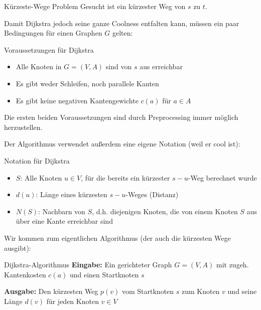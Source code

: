 \documentclass{panikzettel}
\newcommand{\boxspace}{	\vspace{-\baselineskip}	}
\begin{document}
{\begin{defi}{Kürzeste-Wege Problem}
	Gesucht ist ein kürzester Weg von $s$ zu $t$.
\end{defi}

\begin{halfboxl}
	\boxspace
Damit Dijkstra jedoch seine ganze Coolness entfalten kann, müssen ein paar Bedingungen für einen Graphen $G$ gelten:

\begin{theo}{Voraussetzungen für Dijkstra}
\begin{itemize}
	\item Alle Knoten in $G = (V,A)$ sind von $s$ aus erreichbar
	\item Es gibt weder Schleifen, noch parallele Kanten
	\item Es gibt keine negativen Kantengewichte $c(a)$ für $a \in A$
\end{itemize}

Die ersten beiden Voraussetzungen sind durch Preprocessing immer möglich herzustellen.

\end{theo}

\end{halfboxl}%
\begin{halfboxr}
	\boxspace
Der Algorithmus verwendet außerdem eine eigene Notation (weil er cool ist):

	\vspace{\baselineskip}
\begin{defi}{Notation für Dijkstra}
	\begin{itemize}
		\item $S$: Alle Knoten $u \in V$, für die bereits ein kürzester $s-u$-Weg berechnet wurde
		\item $d(u)$: Länge eines kürzesten $s-u$-Weges (Distanz)
		\item $N(S)$: Nachbarn von $S$, d.h. diejenigen Knoten, die von einem Knoten $S$ aus über eine Kante erreichbar sind
	\end{itemize}
\end{defi}
\end{halfboxr}

Wir kommen zum eigentlichen Algorithmus (der auch die kürzesten Wege ausgibt):

\begin{algo}{Dijkstra-Algorithmus }
	\textbf{Eingabe:} Ein gerichteter Graph $G = (V,A)$ mit zugeh. Kantenkosten $c(a)$ und einen Startknoten $s$
	
	\textbf{Ausgabe:} Den kürzesten Weg $p(v)$ vom Startknoten $s$ zum Knoten $v$ und seine Länge $d(v)$ für jeden Knoten $v \in V$
	

\end{algo}}
\end{document}
